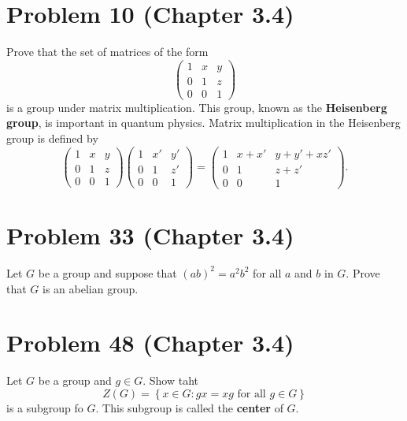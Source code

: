 \documentclass[cm, 10pt]{article}
\newcommand{\set}[1]{\ensuremath{ \left\{ #1 \right\} }}
\begin{document}
    \section*{Problem 10 (Chapter 3.4)}
      Prove that the set of matrices of the form
      \[
        \begin{pmatrix}
          1 & x & y \\
          0 & 1 & z \\
          0 & 0 & 1
        \end{pmatrix}
      \]
      is a group under matrix multiplication. This group, known as the
      \textbf{Heisenberg group}, is important in quantum physics.
      Matrix multiplication in the Heisenberg group is defined by
      \[
        \begin{pmatrix}
          1 & x & y \\
          0 & 1 & z \\
          0 & 0 & 1
        \end{pmatrix}
        \begin{pmatrix}
          1 & x' & y' \\
          0 & 1 & z' \\
          0 & 0 & 1
        \end{pmatrix}
        =
        \begin{pmatrix}
          1 & x + x' & y + y' + xz' \\
          0 & 1 & z + z' \\
          0 & 0 & 1
        \end{pmatrix}.
      \]

    \hrulefill %

    \clearpage


    \section*{Problem 33 (Chapter 3.4)}
      Let $G$ be a group and suppose that $(ab)^2 = a^2b^2$ for all
      $a$ and $b$ in $G$. Prove that $G$ is an abelian group.

    \hrulefill %

    \clearpage


    \section*{Problem 48 (Chapter 3.4)}
      Let $G$ be a group and $g \in G$. Show taht
      \[
        Z(G) = \set{x \in G : gx = xg \text{ for all } g \in G}
      \]
      is a subgroup fo $G$. This subgroup is called the
      \textbf{center} of $G$.
\end{document}
